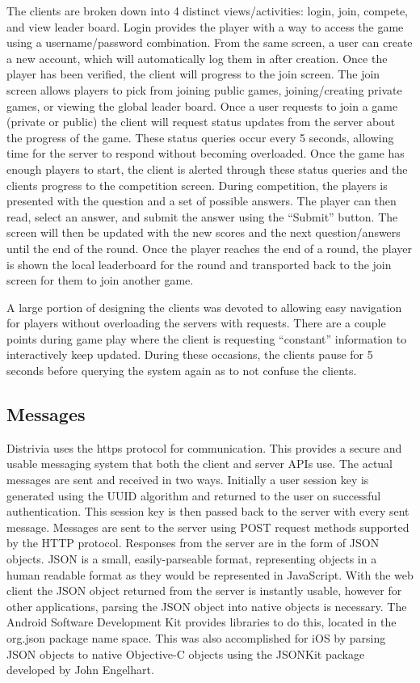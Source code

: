 \documentclass{dependencies/acm_proc_article-sp}
\begin{document}
The clients are broken down into 4 distinct views/activities: login, join, compete, and view leader board. 
Login provides the player with a way to access the game using a username/password combination.  From the same screen, a user can create a new account, which will automatically log them in after creation.
Once the player has been verified, the client will progress to the join screen. 
The join screen allows players to pick from joining public games, joining/creating private games, or viewing the global leader board. 
Once a user requests to join a game (private or public) the client will request status updates from the server about the progress of the game.
These status queries occur every 5 seconds, allowing time for the server to respond without becoming overloaded. 
Once the game has enough players to start, the client is alerted through these status queries and the clients progress to the competition screen.
During competition, the players is presented with the question and a set of possible answers.
The player can then read, select an answer, and submit the answer using the “Submit” button.
The screen will then be updated with the new scores and the next question/answers until the end of the round.
Once the player reaches the end of a round, the player is shown the local leaderboard for the round and transported back to the join screen for them to join another game.

A large portion of designing the clients was devoted to allowing easy navigation for players without overloading the servers with requests.
There are a couple points during game play where the client is requesting “constant” information to interactively keep updated.
During these occasions, the clients pause for 5 seconds before querying the system again as to not confuse the clients.

\subsection{Messages}
Distrivia uses the https protocol for communication.
This provides a secure and usable messaging system that both the client and server APIs use.
The actual messages are sent and received in two ways.
Initially a user session key is generated using the UUID\cite{uuid} algorithm and returned to the user on successful authentication.
This session key is then passed back to the server with every sent message.
Messages are sent to the server using POST request methods supported by the HTTP protocol.
Responses from the server are in the form of JSON \cite{json} objects.
JSON is a small, easily-parseable format, representing objects in a human readable format as they would be represented in JavaScript.
With the web client the JSON object returned from the server is instantly usable, however for other applications, parsing the JSON object into native objects is necessary.
The Android Software Development Kit provides libraries to do this, located in the org.json \cite{orgjson} package name space.
This was also accomplished for iOS by parsing JSON objects to native Objective-C objects using the JSONKit \cite{objcjson} package developed by John Engelhart.
\end{document}
